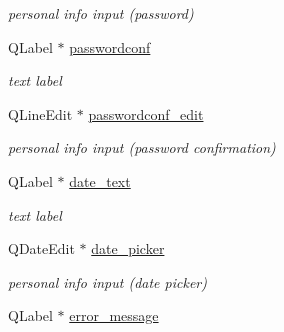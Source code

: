 \begin{DoxyCompactItemize}
\begin{DoxyCompactList}\small\item\em personal info input (password) \end{DoxyCompactList}\item 
\hypertarget{classregisterWidget_a84d7ea56e0c02371d10206f96b0a81b5}{Q\-Label $\ast$ \hyperlink{classregisterWidget_a84d7ea56e0c02371d10206f96b0a81b5}{passwordconf}}\label{classregisterWidget_a84d7ea56e0c02371d10206f96b0a81b5}

\begin{DoxyCompactList}\small\item\em text label \end{DoxyCompactList}\item 
\hypertarget{classregisterWidget_aeccfa539febf2a2363e9d21f21cc852e}{Q\-Line\-Edit $\ast$ \hyperlink{classregisterWidget_aeccfa539febf2a2363e9d21f21cc852e}{passwordconf\-\_\-edit}}\label{classregisterWidget_aeccfa539febf2a2363e9d21f21cc852e}

\begin{DoxyCompactList}\small\item\em personal info input (password confirmation) \end{DoxyCompactList}\item 
\hypertarget{classregisterWidget_a2a0c028a52f28ed9e62c4bdeffeb08f2}{Q\-Label $\ast$ \hyperlink{classregisterWidget_a2a0c028a52f28ed9e62c4bdeffeb08f2}{date\-\_\-text}}\label{classregisterWidget_a2a0c028a52f28ed9e62c4bdeffeb08f2}

\begin{DoxyCompactList}\small\item\em text label \end{DoxyCompactList}\item 
\hypertarget{classregisterWidget_ade5ab97f7eeaf1d52d72065e0150245f}{Q\-Date\-Edit $\ast$ \hyperlink{classregisterWidget_ade5ab97f7eeaf1d52d72065e0150245f}{date\-\_\-picker}}\label{classregisterWidget_ade5ab97f7eeaf1d52d72065e0150245f}

\begin{DoxyCompactList}\small\item\em personal info input (date picker) \end{DoxyCompactList}\item 
\hypertarget{classregisterWidget_aeb47a06757788734f8f137154bd08d1c}{Q\-Label $\ast$ \hyperlink{classregisterWidget_aeb47a06757788734f8f137154bd08d1c}{error\-\_\-message}}\label{classregisterWidget_aeb47a06757788734f8f137154bd08d1c}


\end{DoxyCompactItemize}
